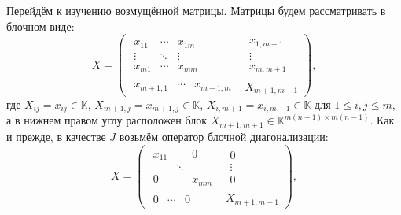\documentclass[12pt]{article}
\theoremstyle{definition}
\begin{document}
Перейдём к изучению возмущённой матрицы.
Матрицы будем рассматривать в блочном виде:
\[
    X =
        \left(\begin{array}{c|c}
            \begin{matrix}
                x_{11} & \cdots & x_{1m} \\
                \vdots & \ddots & \vdots \\
                x_{m1} & \cdots & x_{mm}
            \end{matrix} &
            \begin{matrix}
                x_{1,m+1} \\
                \vdots \\
                x_{m,m+1}
            \end{matrix} \\ \hline
            \begin{matrix}
                x_{m+1,1} &
                \cdots &
                x_{m+1,m}
            \end{matrix} &
            X_{m+1,m+1}
        \end{array}\right),
    \]
где
\( X_{ij}      {=} x_{ij}      {\in} \mathbb{K} \),
\( X_{m{+}1,j} {=} x_{m{+}1,j} {\in} \mathbb{K} \),
\( X_{i,m{+}1} {=} x_{i,m{+}1} {\in} \mathbb{K} \)
для \( 1\leq i,j \leq m \),
а в нижнем правом углу расположен блок
\( X_{m{+}1,m{+}1} {\in} \mathbb{K}^{m(n{-}1){\times}m(n-1)} \).
Как и прежде, в качестве \( J \)
возьмём оператор блочной диагонализации:
\[
    X =
        \left(\begin{array}{c|c}
            \begin{matrix}
                x_{11} &  & 0 \\
                 & \ddots &  \\
                0 &  & x_{mm}
            \end{matrix} &
            \begin{matrix}
                0 \\
                \vdots \\
                0
            \end{matrix} \\ \hline
            \begin{matrix}
                0 & \cdots & 0
            \end{matrix} &
            X_{m+1,m+1}
        \end{array}\right),
    \]
\end{document}
